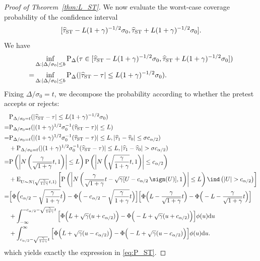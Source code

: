 \documentclass[11pt]{article}
\def\P{{\mathrm P}}
\def\E{{\mathrm E}}
\def\d{{\mathrm d}}
\newcommand{\htau}{\widehat\tau}
\numberwithin{equation}{section}
\theoremstyle{definition}
\begin{document}
\begin{proof}[Proof of Theorem~\ref{thm:L_ST}]
We now evaluate the worst-case coverage probability of the confidence interval
\[
  [\htau_{\rm ST} - L (1+\gamma)^{-1/2} \sigma_0, \htau_{\rm ST} + L (1+\gamma)^{-1/2} \sigma_0].
\]
We have
\begin{align*}
  & \inf_{\Delta: \lvert \Delta/\sigma_0 \rvert \le b} \P_\Delta(\tau \in [\htau_{\rm ST} - L (1+\gamma)^{-1/2} \sigma_0, \htau_{\rm ST} + L (1+\gamma)^{-1/2} \sigma_0])\\
  =& \inf_{\Delta: \lvert \Delta/\sigma_0 \rvert \le b} \P_\Delta(\lvert \htau_{\rm ST} - \tau \rvert \le L (1+\gamma)^{-1/2} \sigma_0).
\end{align*}
Fixing $\Delta/\sigma_0=t$, we decompose the probability according to whether the pretest accepts or rejects:
\begin{align*}
  &\P_{\Delta/\sigma_0 = t}(\lvert \htau_{\rm ST} - \tau \rvert \le L (1+\gamma)^{-1/2} \sigma_0)\\
  =&\P_{\Delta/\sigma_0 = t}(\lvert (1+\gamma)^{1/2} \sigma_0^{-1} (\htau_{\rm ST} - \tau) \rvert \le L)\\
  =&\P_{\Delta/\sigma_0 = t}(\lvert (1+\gamma)^{1/2} \sigma_0^{-1} (\htau_{\rm ST} - \tau) \rvert \le L, \lvert \htau_1 - \htau_0 \rvert \le \sigma c_{\alpha/2}) \\
  &+ \P_{\Delta/\sigma_0 = t}(\lvert (1+\gamma)^{1/2} \sigma_0^{-1} (\htau_{\rm ST} - \tau) \rvert \le L, \lvert \htau_1 - \htau_0 \rvert > \sigma c_{\alpha/2})\\ 
  =& \P\left( \left\lvert N\left(\frac{\gamma}{\sqrt{1+\gamma}} t, 1\right) \right\rvert \le L \right) \P\left( \left\lvert N\left(\sqrt{\frac{\gamma}{1+\gamma}} t, 1\right) \right\rvert \le c_{\alpha/2} \right)\\
  &+ \E_{U \sim N(\sqrt{\frac{\gamma}{1+\gamma}} t, 1)}\left[\P\left( \left\lvert N\left(\frac{\gamma}{\sqrt{1+\gamma}} t - \sqrt{\gamma} [U - c_{\alpha/2}\,\sign(U)], 1\right) \right\rvert \le L \right) \ind\left(\lvert U \rvert > c_{\alpha/2}\right)\right]\\
  =& \Big[\Phi\Big(c_{\alpha/2} - \sqrt{\frac{\gamma}{1+\gamma}}t \Big) - \Phi\Big(-c_{\alpha/2} - \sqrt{\frac{\gamma}{1+\gamma}}t \Big)\Big]\Big[\Phi\Big(L - \frac{\gamma}{\sqrt{1+\gamma}}t \Big) - \Phi\Big(-L - \frac{\gamma}{\sqrt{1+\gamma}}t \Big)\Big]\\
  &+ \int_{-\infty}^{-c_{\alpha/2} - \sqrt{\frac{\gamma}{1+\gamma}}t} \Big[\Phi\Big(L + \sqrt{\gamma} (u+c_{\alpha/2})\Big) - \Phi\Big(-L + \sqrt{\gamma} (u+c_{\alpha/2})\Big)\Big] \phi(u) \d u\\
  &+ \int_{c_{\alpha/2} - \sqrt{\frac{\gamma}{1+\gamma}}t}^\infty \Big[\Phi\Big(L + \sqrt{\gamma} (u-c_{\alpha/2})\Big) - \Phi\Big(-L + \sqrt{\gamma} (u-c_{\alpha/2})\Big)\Big] \phi(u) \d u.
\end{align*}
which yields exactly the expression in \eqref{eq:P_ST}.


\end{proof}
\end{document}

